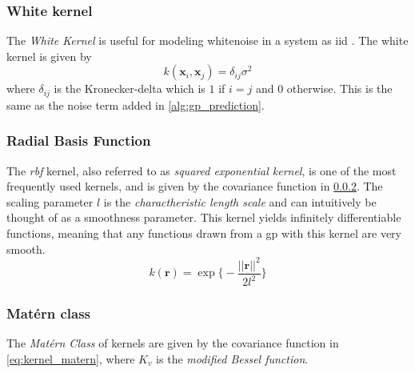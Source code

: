 \subsubsection{White kernel}
The \textit{White Kernel} is useful for modeling whitenoise in a system as \acrshort{iid} \cite{scikit-learn}. The white kernel is given by
\begin{equation}
    k(\boldsymbol{x}_i, \boldsymbol{x}_j) = \delta_{ij} \sigma^2
\end{equation}
where $\delta_{ij}$ is the Kronecker-delta which is $1$ if $i=j$ and $0$ otherwise. This is the same as the noise term added in \cref{alg:gp_prediction}.

\subsubsection{Radial Basis Function}\label{sec:kernels_rbf}
The \textit{\acrfull{rbf}} kernel, also referred to as \textit{squared exponential kernel}, is one of the most frequently used kernels, and is given by the covariance function in \cref{sec:kernels_rbf}. The scaling parameter $l$ is the \textit{charactheristic length scale} and can intuitively be thought of as a smoothness parameter. This kernel yields infinitely differentiable functions, meaning that any functions drawn from a \acrshort{gp} with this kernel are very smooth\cite{rasmussen}.
\begin{equation}\label{eq:kernel_rbf}
    k(\boldsymbol{r}) = \exp \big\{-\frac{||\boldsymbol{r}||^2}{2 l^2}\big\}
\end{equation} 

\subsubsection{Matérn class}
The \textit{Matérn Class} of kernels are given by the covariance function in \cref{eq:kernel_matern}, where $K_v$ is the \textit{modified Bessel function}. 

